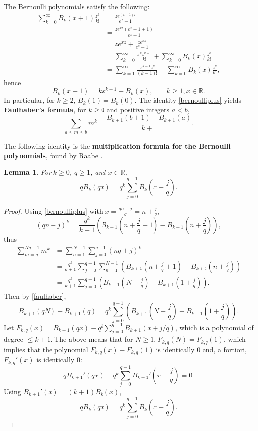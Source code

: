 \documentclass{amsart}
\newtheorem{lemma}[theorem]{Lemma}
\begin{document}
The Bernoulli polynomials  satisfy the following:
\begin{align*}
\sum_{k=0}^\infty B_k(x+1) \frac{z^k}{k!}&=\frac{ze^{(x+1)z}}{e^z-1}\\
&=\frac{ze^{xz} (e^z-1+1)}{e^z-1}\\
&=ze^{xz}+\frac{ze^{xz}}{e^z-1}\\
&=\sum_{k=0}^\infty \frac{x^k z^{k+1}}{k!} + \sum_{k=0}^\infty B_k(x) \frac{z^k}{k!}\\
&=\sum_{k=1}^\infty \frac{x^{k-1} z^k}{(k-1)!} +  \sum_{k=0}^\infty B_k(x) \frac{z^k}{k!},
\end{align*}
hence
\begin{equation}
B_k(x+1) = kx^{k-1} + B_k(x),\qquad k \geq 1, x \in \mathbb{R}.
\label{bernoulliplus}
\end{equation}
In particular, for $k \geq 2$,
$B_k(1)=B_k(0)$.
The  identity  \eqref{bernoulliplus} yields \textbf{Faulhaber's formula}, for $k \geq 0$ and positive integers $a < b$,
\begin{equation}
\sum_{a \leq m \leq b} m^k = \frac{B_{k+1}(b+1)-B_{k+1}(a)}{k+1}.
\label{faulhaber}
\end{equation}



The following identity is  the \textbf{multiplication formula for the Bernoulli polynomials}, found by Raabe \cite[pp.~19--24,
\S 13]{raabe}.

\begin{lemma}
For $k \geq 0$, $q \geq 1$, and $x \in \mathbb{R}$,
\[ 
q B_k(qx) = q^k \sum_{j=0}^{q-1} B_k\left(x+\frac{j}{q}\right).
\]
\label{bernoullisum}
\end{lemma}
\begin{proof}
Using \eqref{bernoulliplus} with $x=\frac{qn+j}{q}=n+\frac{j}{q}$,
\[
(qn+j)^k  = \frac{q^k}{k+1} \left( B_{k+1} \left(n+\frac{j}{q}+1\right) - B_{k+1}\left(n+\frac{j}{q}\right)\right),
\]
 thus
\begin{align*}
\sum_{m=q}^{Nq-1} m^k& = \sum_{n=1}^{N-1} \sum_{j=0}^{q-1} (nq+j)^k \\
&= \frac{q^k}{k+1} \sum_{j=0}^{q-1} \sum_{n=1}^{N-1} \left( B_{k+1} \left(n+\frac{j}{q}+1\right) - B_{k+1}\left(n+\frac{j}{q}\right)\right)\\
&= \frac{q^k}{k+1} \sum_{j=0}^{q-1} \left( B_{k+1} \left(N+\frac{j}{q}\right)-B_{k+1}\left(1+\frac{j}{q}\right)\right).
\end{align*}
Then by \eqref{faulhaber},
\[
B_{k+1}(qN)-B_{k+1}(q) = q^k \sum_{j=0}^{q-1} \left( B_{k+1} \left(N+\frac{j}{q}\right)-B_{k+1}\left(1+\frac{j}{q}\right)\right).
\]
Let $F_{k,q}(x) = B_{k+1}(qx) - q^k \sum_{j=0}^{q-1} B_{k+1} (x+ j/q)$, 
which is a polynomial of degree $\leq k+1$. The above means 
that for $N \geq 1$, $F_{k,q}(N)=F_{k,q}(1)$, which implies that the polynomial $F_{k,q}(x)-F_{k,q}(1)$ is identically $0$
and, a fortiori, $F_{k,q}'(x)$ is identically $0$:
\[
q B_{k+1}'(qx) - q^k \sum_{j=0}^{q-1} B_{k+1}'\left(x+\frac{j}{q} \right) = 0.
\]
Using $B_{k+1}'(x) = (k+1) B_k(x)$,
\[
q B_k(qx) = q^k \sum_{j=0}^{q-1} B_k\left(x+\frac{j}{q}\right).
\]
\end{proof}
\end{document}
